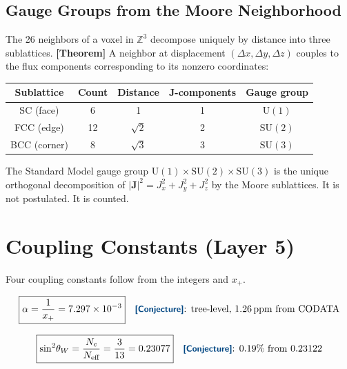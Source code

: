 \documentclass[12pt]{article}
\theoremstyle{definition}
\theoremstyle{remark}
\newcommand{\epi}[1]{\textnormal{{\small\sffamily\bfseries\color{ftdblue}[#1]}}}
\begin{document}
\subsection{Gauge Groups from the Moore Neighborhood}

The 26 neighbors of a voxel in $\mathbb{Z}^3$ decompose uniquely by distance into three sublattices. \epi{Theorem} A neighbor at displacement $(\Delta x, \Delta y, \Delta z)$ couples to the flux components corresponding to its nonzero coordinates:

\begin{center}\small
\begin{tabular}{@{}ccccc@{}}
\toprule
Sublattice & Count & Distance & $\mathbf{J}$-components & Gauge group \\
\midrule
SC (face) & 6 & 1 & 1 & $\mathrm{U}(1)$ \\
FCC (edge) & 12 & $\sqrt{2}$ & 2 & $\mathrm{SU}(2)$ \\
BCC (corner) & 8 & $\sqrt{3}$ & 3 & $\mathrm{SU}(3)$ \\
\bottomrule
\end{tabular}
\end{center}

The Standard Model gauge group $\mathrm{U}(1) \times \mathrm{SU}(2) \times \mathrm{SU}(3)$ is the unique orthogonal decomposition of $|\mathbf{J}|^2 = J_x^2 + J_y^2 + J_z^2$ by the Moore sublattices. It is not postulated. It is counted.

\section{Coupling Constants (Layer 5)}

\noindent Four coupling constants follow from the integers and $x_+$.

\begin{equation}
\boxed{\alpha = \frac{1}{x_+} = 7.297\times 10^{-3}}
\quad\text{\epi{Conjecture}: tree-level, 1.26\,ppm from CODATA}
\end{equation}

\begin{equation}
\boxed{\sin^2\!\theta_W = \frac{N_c}{N_\text{eff}} = \frac{3}{13} = 0.23077}
\quad\text{\epi{Conjecture}: 0.19\% from 0.23122}
\end{equation}
\end{document}
